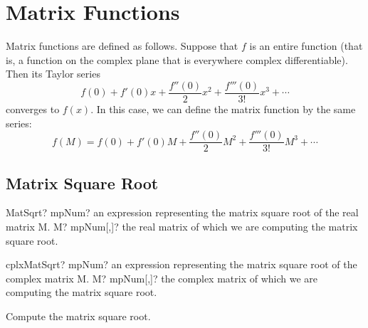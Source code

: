 \newpage
\section{Matrix Functions}
\label{Matrix Functions}

Matrix functions are defined as follows. Suppose that $f$ is an entire function (that is, a function on the complex plane that is everywhere complex differentiable). Then its Taylor series 
\begin{equation}
f(0) + f'(0)x + \frac{f''(0)}{2}x^2  + \frac{f'''(0)}{3!}x^3 + \cdots
\end{equation}
converges to $f(x)$. In this case, we can define the matrix function by the same series: 
\begin{equation}
f(M) = f(0) + f'(0)M + \frac{f''(0)}{2}M^2  + \frac{f'''(0)}{3!}M^3 + \cdots
\end{equation}




\subsection{Matrix Square Root}


\begin{mpFunctionsExtract}
	\mpFunctionOne
	{MatSqrt? mpNum? an expression representing the matrix square root of the real matrix M.}
	{M? mpNum[,]? the real matrix of which we are computing the matrix square root.}
\end{mpFunctionsExtract}

\vspace{0.6cm}
\begin{mpFunctionsExtract}
	\mpFunctionOne
	{cplxMatSqrt? mpNum? an expression representing the matrix square root of the complex matrix M.}
	{M? mpNum[,]? the complex matrix of which we are computing the matrix square root.}
\end{mpFunctionsExtract}


%

\vspace{0.3cm}
Compute the matrix square root.

